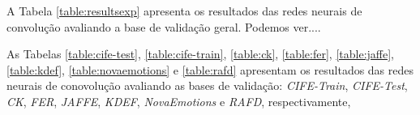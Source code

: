 A Tabela \ref{table:resultsexp} apresenta os resultados das redes neurais de convolução avaliando a base de validação geral. Podemos ver....

As Tabelas \ref{table:cife-test}, \ref{table:cife-train}, \ref{table:ck}, \ref{table:fer}, \ref{table:jaffe}, \ref{table:kdef}, \ref{table:novaemotions} e \ref{table:rafd} apresentam os resultados das redes neurais de conovolução avaliando as bases de validação: \textit{CIFE-Train}, \textit{CIFE-Test}, \textit{CK}, \textit{FER}, \textit{JAFFE}, \textit{KDEF}, \textit{NovaEmotions} e \textit{RAFD}, respectivamente, 




